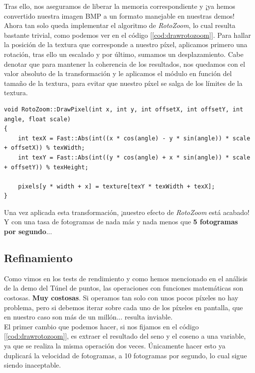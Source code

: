 Tras ello, nos aseguramos de liberar la memoria correspondiente y ¡ya hemos convertido nuestra imagen BMP a un formato manejable en nuestras demos!\\

Ahora tan solo queda implementar el algoritmo de \emph{RotoZoom}, lo cual resulta bastante trivial, como podemos ver en el código [\ref{cod:drawrotozoom}]. Para hallar la posición de la textura que corresponde a nuestro píxel, aplicamos primero una rotación, tras ello un escalado y por último, sumamos un desplazamiento. Cabe denotar que para mantener la coherencia de los resultados, nos quedamos con el valor absoluto de la transformación y le aplicamos el módulo en función del tamaño de la textura, para evitar que nuestro píxel se salga de los límites de la textura.\\

\begin{lstlisting}[style=C-color, caption={Dibujar un píxel cuya textura se desplaza en función de un ángulo, una escala y una traslación}, label=cod:drawrotozoom]
void RotoZoom::DrawPixel(int x, int y, int offsetX, int offsetY, int angle, float scale)
{
    int texX = Fast::Abs(int((x * cos(angle) - y * sin(angle)) * scale + offsetX)) % texWidth;
    int texY = Fast::Abs(int((y * cos(angle) + x * sin(angle)) * scale + offsetY)) % texHeight;

    pixels[y * width + x] = texture[texY * texWidth + texX];
}
\end{lstlisting}

Una vez aplicada esta transformación, ¡nuestro efecto de \emph{RotoZoom} está acabado! Y con una tasa de fotogramas de nada más y nada menos que \textbf{5 fotogramas por segundo}...

\subsection{Refinamiento}

Como vimos en los tests de rendimiento y como hemos mencionado en el análisis de la demo del Túnel de puntos, las operaciones con funciones matemáticas son costosas. \textbf{Muy costosas}. Si operamos tan solo con unos pocos píxeles no hay problema, pero si debemos iterar sobre cada uno de los píxeles en pantalla, que en nuestro caso son más de un millón... resulta inviable.\\

El primer cambio que podemos hacer, si nos fijamos en el código [\ref{cod:drawrotozoom}], es extraer el resultado del seno y el coseno a una variable, ya que se realiza la misma operación dos veces. Únicamente hacer esto ya duplicará la velocidad de fotogramas, a 10 fotogramas por segundo, lo cual sigue siendo inaceptable.\\

